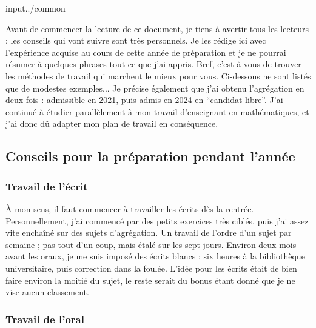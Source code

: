 input{../common}





  Avant de commencer la lecture de ce document, je tiens à avertir tous les lecteurs : les conseils qui vont suivre sont très personnels. Je les rédige ici avec l'expérience acquise au cours de cette année de préparation et je ne pourrai résumer à quelques phrases tout ce que j'ai appris. Bref, c'est à vous de trouver les méthodes de travail qui marchent le mieux pour vous. Ci-dessous ne sont listés que de modestes exemples...
  \newpar
  Je précise également que j'ai obtenu l'agrégation en deux fois : admissible en 2021, puis admis en 2024 en ``candidat libre''. J'ai continué à étudier parallèlement à mon travail d'enseignant en mathématiques, et j'ai donc dû adapter mon plan de travail en conséquence.

  \subsection{Conseils pour la préparation pendant l'année}

  \subsubsection{Travail de l'écrit}

  À mon sens, il faut commencer à travailler les écrits dès la rentrée. Personnellement, j'ai commencé par des petits exercices très ciblés, puis j'ai assez vite enchaîné sur des sujets d'agrégation. Un travail de l'ordre d'un sujet par semaine ; pas tout d'un coup, mais étalé sur les sept jours. Environ deux mois avant les oraux, je me suis imposé des écrits blancs : six heures à la bibliothèque universitaire, puis correction dans la foulée.
  \newpar
  L'idée pour les écrits était de bien faire environ la moitié du sujet, le reste serait du bonus étant donné que je ne vise aucun classement.

  \subsubsection{Travail de l'oral}

